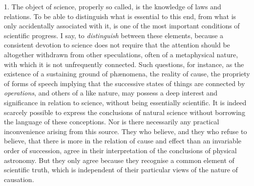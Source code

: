 \documentclass[oneside]{book}
\begin{document}
1. The object of science, properly so called, is the knowledge
of laws and relations. To be able to distinguish what
is essential to this end, from what is only accidentally associated
with it, is one of the most important conditions of scientific progress.
I say, to \textit{distinguish} between these elements, because a consistent
devotion to science does not require that the attention
should be altogether withdrawn from other speculations, often of a
metaphysical nature, with which it is not unfrequently connected.
Such questions, for instance, as the existence of a sustaining
ground of ph\ae nomena, the reality of cause, the propriety of forms
of speech implying that the successive states of things are connected
by \textit{operations}, and others of a like nature, may possess
a deep interest and significance in relation to science, without
being essentially scientific. It is indeed scarcely possible to
express the conclusions of natural science without borrowing
the language of these conceptions. Nor is there necessarily
any practical inconvenience arising from this source. They who
believe, and they who refuse to believe, that there is more in the
relation of cause and effect than an invariable order of succession,
agree in their interpretation of the conclusions of physical astronomy.
But they only agree because they recognise a common element
of scientific truth, which is independent of their particular
views of the nature of causation.
\end{document}
